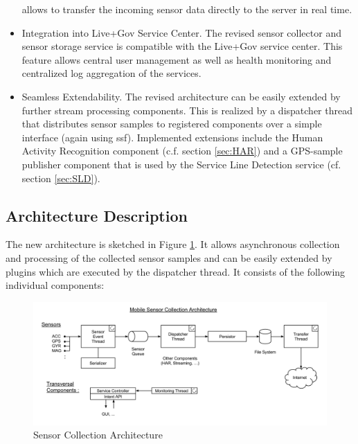 \begin{itemize}
  allows to transfer the incoming sensor data directly to the server
  in real time. 
\item Integration into Live+Gov Service Center. The revised sensor
  collector and sensor storage service is compatible with the Live+Gov
  service center. This feature allows central user management as well
  as health monitoring and centralized log aggregation of the services.
\item Seamless Extendability. The revised architecture can be easily
  extended by further stream processing components. This is realized
  by a dispatcher thread that distributes sensor samples to registered
  components over a simple interface (again using ssf). Implemented
  extensions include the Human Activity Recognition component
  (c.f. section \ref{sec:HAR}) and a GPS-sample publisher component
  that is used by the Service Line Detection service (cf. section
  \ref{sec:SLD}).
\end{itemize}

\subsection{Architecture Description}

The new architecture is sketched in Figure
\ref{fig:sc_architecture}. It allows asynchronous collection and
processing of the collected sensor samples and can be easily extended
by plugins which are executed by the dispatcher thread. It consists of
the following individual components:

\begin{figure}[h]
\centering
\includegraphics[width=\textwidth]{img/sc/sc_architecture.png}
\caption{Sensor Collection Architecture}\label{fig:sc_architecture}
\end{figure}

